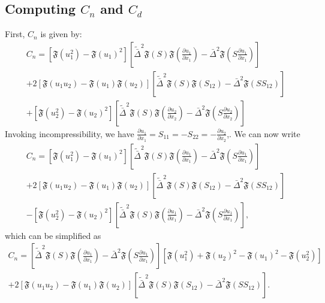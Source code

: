\documentclass[11pt,a4paper]{article}
\begin{document}
\subsection{Computing $C_n$ and $C_d$}
First, $C_n$ is given by:
\begin{multline*}
C_n = \left[\mathfrak{F}\left( u_1^2\right) - \mathfrak{F}\left(u_1\right)^2\right]\left[\tilde{\bar{\Delta}}^2\mathfrak{F}\left(S\right)\mathfrak{F}\left(\frac{\partial u_1}{\partial x_1}\right) - \bar{\Delta}^2\mathfrak{F}\left(S\frac{\partial u_1}{\partial x_1}\right)\right]\\+2\left[\mathfrak{F}\left( u_1u_2\right) - \mathfrak{F}\left(u_1\right)\mathfrak{F}\left(u_2\right)\right]\left[\tilde{\bar{\Delta}}^2\mathfrak{F}\left(S\right)\mathfrak{F}\left({S}_{12}\right) - \bar{\Delta}^2\mathfrak{F}\left(S{S}_{12}\right)\right]\\+\left[\mathfrak{F}\left( u_2^2\right) - \mathfrak{F}\left(u_2\right)^2\right]\left[\tilde{\bar{\Delta}}^2\mathfrak{F}\left(S\right)\mathfrak{F}\left(\frac{\partial u_2}{\partial x_2}\right)-\bar{\Delta}^2\mathfrak{F}\left(S\frac{\partial u_2}{\partial x_2}\right)\right]
\end{multline*}
Invoking incompressibility, we have $\frac{\partial u_1}{\partial x_1} = S_{11} = -S_{22} =-\frac{\partial u_2}{\partial x_2}$,. We can now write
\begin{multline*}
C_n = \left[\mathfrak{F}\left( u_1^2\right) - \mathfrak{F}\left(u_1\right)^2\right]\left[\tilde{\bar{\Delta}}^2\mathfrak{F}\left(S\right)\mathfrak{F}\left(\frac{\partial u_1}{\partial x_1}\right) - \bar{\Delta}^2\mathfrak{F}\left(S\frac{\partial u_1}{\partial x_1}\right)\right]\\
+2\left[\mathfrak{F}\left( u_1u_2\right) - \mathfrak{F}\left(u_1\right)\mathfrak{F}\left(u_2\right)\right]\left[\tilde{\bar{\Delta}}^2\mathfrak{F}\left(S\right)\mathfrak{F}\left({S}_{12}\right) - \bar{\Delta}^2\mathfrak{F}\left(S{S}_{12}\right)\right]\\
-\left[\mathfrak{F}\left( u_2^2\right) - \mathfrak{F}\left(u_2\right)^2\right]\left[\tilde{\bar{\Delta}}^2\mathfrak{F}\left(S\right)\mathfrak{F}\left(\frac{\partial u_1}{\partial x_1}\right)-\bar{\Delta}^2\mathfrak{F}\left(S\frac{\partial u_1}{\partial x_1}\right)\right],
\end{multline*}
which can be simplified as
\begin{multline}\label{C_n}
C_n = \left[\tilde{\bar{\Delta}}^2\mathfrak{F}\left(S\right)\mathfrak{F}\left(\frac{\partial u_1}{\partial x_1}\right) - \bar{\Delta}^2\mathfrak{F}\left(S\frac{\partial u_1}{\partial x_1}\right)\right]\left[\mathfrak{F}\left( u_1^2\right) + \mathfrak{F}\left(u_2\right)^2 - \mathfrak{F}\left(u_1\right)^2 - \mathfrak{F}\left( u_2^2\right) \right]\\
+2\left[\mathfrak{F}\left( u_1u_2\right) - \mathfrak{F}\left(u_1\right)\mathfrak{F}\left(u_2\right)\right]\left[\tilde{\bar{\Delta}}^2\mathfrak{F}\left(S\right)\mathfrak{F}\left({S}_{12}\right) - \bar{\Delta}^2\mathfrak{F}\left(S{S}_{12}\right)\right].
\end{multline}
\end{document}
